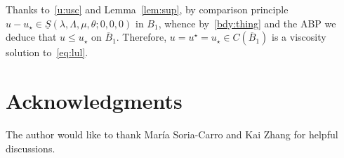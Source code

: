 \documentclass[letter,11pt]{amsart}
\theoremstyle{definition}
\numberwithin{equation}{section}
\begin{document}
\medskip

Thanks to~\eqref{u:usc} and Lemma~\ref{lem:sup}, by comparison principle $u - u_{\star} \in \underline{S}(\lambda, \Lambda, \mu, \theta; 0,0,0)$ in $B_1$, whence by~\eqref{bdy:thing} and the ABP we deduce that $u \leq u_{\star}$ on $\overline{B}_1$.
Therefore, $u = u^{\star} = u_{\star} \in C(\overline{B}_{1})$ is a viscosity solution to~\eqref{eq:lul}.


\section*{Acknowledgments}

The author would like to thank Mar\'{i}a Soria-Carro and Kai Zhang for helpful discussions.
\end{document}
